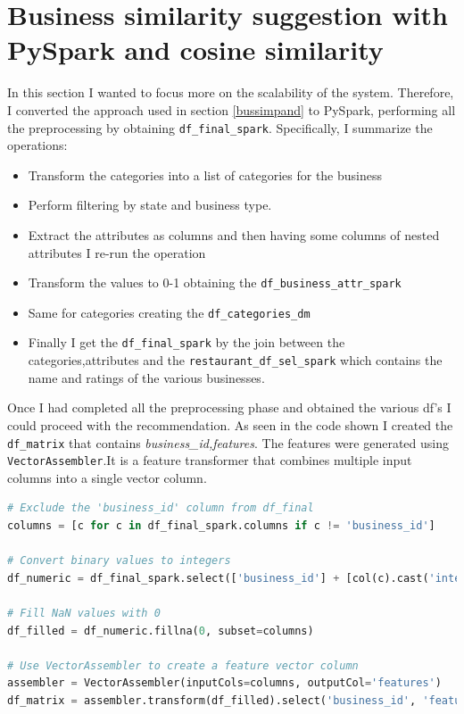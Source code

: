\documentclass[12pt,english]{report}
\begin{document}
\section{Business similarity suggestion with PySpark and cosine similarity}
In this section I wanted to focus more on the scalability of the system. Therefore, I converted the approach used in section \ref{bussimpand} to PySpark, performing all the preprocessing by obtaining \texttt{df\_final\_spark}. Specifically, I summarize the operations:
\begin{itemize}
\item Transform the categories into a list of categories for the business
\item Perform filtering by state and business type.
\item Extract the attributes as columns and then having some columns of nested attributes I re-run the operation
\item Transform the values to 0-1 obtaining the \texttt{df\_business\_attr\_spark}
\item Same for categories creating the \texttt{df\_categories\_dm}
\item Finally I get the \texttt{df\_final\_spark} by the join between the categories,attributes and the \texttt{restaurant\_df\_sel\_spark} which contains the name and ratings of the various businesses.
\end{itemize}
Once I had completed all the preprocessing phase and obtained the various df's I could proceed with the recommendation. As seen in the code shown I created the \texttt{df\_matrix} that contains \textit{business\_id,features}. The features were generated using \texttt{VectorAssembler}.It is a feature transformer that combines multiple input columns into a single vector column.
\begin{lstlisting}[language={Python},escapechar=|,label={lst:simpyspark},caption={Suggestion system in PySpark}]
# Exclude the 'business_id' column from df_final
columns = [c for c in df_final_spark.columns if c != 'business_id']

# Convert binary values to integers
df_numeric = df_final_spark.select(['business_id'] + [col(c).cast('integer') for c in columns])

# Fill NaN values with 0
df_filled = df_numeric.fillna(0, subset=columns)

# Use VectorAssembler to create a feature vector column
assembler = VectorAssembler(inputCols=columns, outputCol='features')
df_matrix = assembler.transform(df_filled).select('business_id', 'features')
\end{lstlisting}
\end{document}
